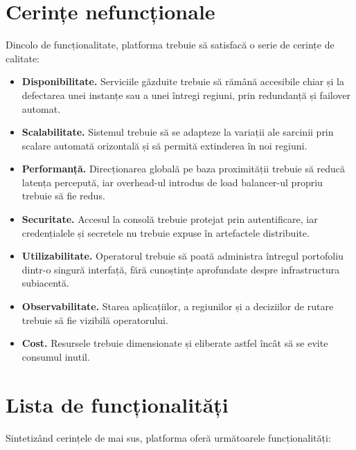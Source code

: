 \documentclass[12pt,a4paper]{report}
\begin{document}
\section{Cerințe nefuncționale}
Dincolo de funcționalitate, platforma trebuie să satisfacă o serie de cerințe de calitate:

\begin{itemize}
	\item \textbf{Disponibilitate.} Serviciile găzduite trebuie să rămână accesibile chiar și la defectarea unei instanțe sau a unei întregi regiuni, prin redundanță și failover automat.
	\item \textbf{Scalabilitate.} Sistemul trebuie să se adapteze la variații ale sarcinii prin scalare automată orizontală și să permită extinderea în noi regiuni.
	\item \textbf{Performanță.} Direcționarea globală pe baza proximității trebuie să reducă latența percepută, iar overhead-ul introdus de load balancer-ul propriu trebuie să fie redus.
	\item \textbf{Securitate.} Accesul la consolă trebuie protejat prin autentificare, iar credențialele și secretele nu trebuie expuse în artefactele distribuite.
	\item \textbf{Utilizabilitate.} Operatorul trebuie să poată administra întregul portofoliu dintr-o singură interfață, fără cunoștințe aprofundate despre infrastructura subiacentă.
	\item \textbf{Observabilitate.} Starea aplicațiilor, a regiunilor și a deciziilor de rutare trebuie să fie vizibilă operatorului.
	\item \textbf{Cost.} Resursele trebuie dimensionate și eliberate astfel încât să se evite consumul inutil.
\end{itemize}

\section{Lista de funcționalități}
Sintetizând cerințele de mai sus, platforma oferă următoarele funcționalități:
\end{document}
